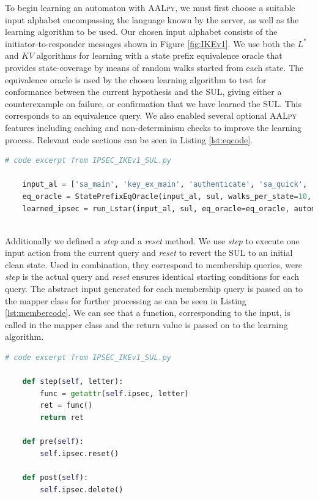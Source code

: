 To begin learning an automaton with \textsc{AALpy}, we must first choose a suitable input alphabet encompassing the language known by the server, as well as the learning algorithm to be used. Our chosen input alphabet consists of the initiator-to-responder messages shown in Figure \ref{fig:IKEv1}. We use both the $L^*$ and $KV$ algorithms for learning with a state prefix equivalence oracle that provides state-coverage by means of random walks started from each state. The equivalence oracle is used by the chosen learning algorithm to test for conformance between the current hypothesis and the SUL, giving either a counterexample on failure, or confirmation that we have learned the SUL. This corresponds to an equivalence query. We also enabled several optional \textsc{AALpy} features including caching and non-determinism checks to improve the learning process. Relevant code sections can be seen in Listing \ref{lst:eqcode}.

\begin{lstlisting}[float=h, caption=Equivalence Query code, label=lst:eqcode, numbers=none, language=python]
	# code excerpt from IPSEC_IKEv1_SUL.py
	
	input_al = ['sa_main', 'key_ex_main', 'authenticate', 'sa_quick', 'ack_quick']
	eq_oracle = StatePrefixEqOracle(input_al, sul, walks_per_state=10, walk_len=10)
	learned_ipsec = run_Lstar(input_al, sul, eq_oracle=eq_oracle, automaton_type='mealy', cache_and_non_det_check=True)
	
\end{lstlisting}

Additionally we defined a \emph{step} and a \emph{reset} method. We use \emph{step} to execute one input action from the current query and \emph{reset} to revert the SUL to an initial clean state. Used in combination, they correspond to membership queries, were \emph{step} is the actual query and \emph{reset} ensures identical starting conditions for each query. The abstract input generated for each membership query is passed on to the mapper class for further processing as can be seen in Listing \ref{lst:membercode}. We can see that a function, corresponding to the input, is called in the mapper class and the return value is passed on to the learning algorithm. \\

\begin{lstlisting}[float=h, caption=Membership Query code, label=lst:membercode, numbers=none, language=python]
	# code excerpt from IPSEC_IKEv1_SUL.py
	
	def step(self, letter):
		func = getattr(self.ipsec, letter)
		ret = func()
		return ret
	
	def pre(self):
		self.ipsec.reset()
		
	def post(self):
		self.ipsec.delete()
\end{lstlisting}

